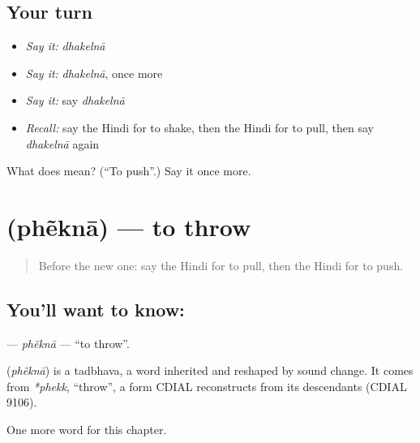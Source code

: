 \subsection*{Your turn}
\begin{itemize}
\raggedright
  \item \emph{Say it:} \emph{dhakelnā}
  \item \emph{Say it:} \emph{dhakelnā}, once more
  \item \emph{Say it:} say \emph{dhakelnā}
  \item \emph{Recall:} say the Hindi for to shake, then the Hindi for to pull, then say \emph{dhakelnā} again
\end{itemize}

\begin{tcolorbox}[breakable,colback=teal!4,colframe=teal!35!black,title={Before you move on}]
What does  mean? (\textquotedblleft{}To push\textquotedblright{}.) Say it once more.
\end{tcolorbox}
\section[\texorpdfstring{\hi{फेंकना} (phẽknā)}{फेंकना (phẽknā)}]{ (phẽknā) — to throw}

\label{lesson:HI-C176-phekna}



\begin{quote}
Before the new one: say the Hindi for to pull, then the Hindi for to push.
\end{quote}

\subsection*{You'll want to know: }
\textbf{} — \emph{phẽknā} — \textquotedblleft{}to throw\textquotedblright{}.

\begin{cousinweb}
\textbf{} (\emph{phẽknā}) is a tadbhava, a word inherited and reshaped by sound change. It comes from \emph{*phekk}, \textquotedblleft{}throw\textquotedblright{}, a form CDIAL reconstructs from its descendants (CDIAL 9106).
\end{cousinweb}

\begin{grammarlens}[title={What you've built}]
One more word for this chapter.
\end{grammarlens}

